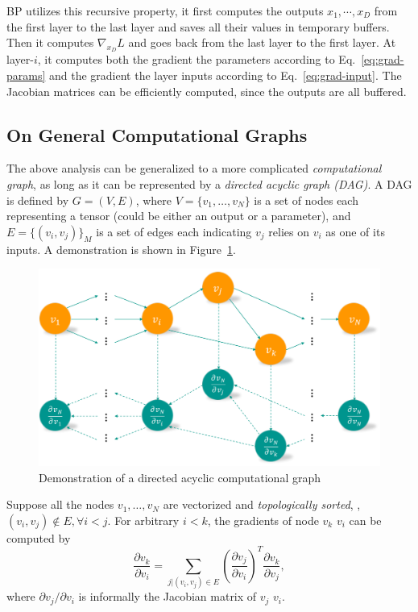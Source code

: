BP utilizes this recursive property, it first computes the outputs $x_1, \cdots, x_D$ from the first layer to the last layer and saves all their values in temporary buffers. Then it computes $\nabla_{x_D}L$ and goes back from the last layer to the first layer. At layer-$i$, it computes both the gradient \wrt the parameters according to Eq.~\eqref{eq:grad-params} and the gradient \wrt the layer inputs according to Eq.~\eqref{eq:grad-input}. The Jacobian matrices can be efficiently computed, since the outputs are all buffered.

\subsection{On General Computational Graphs} %
\label{sub:dl-bp-on-graphs}
The above analysis can be generalized to a more complicated \emph{computational graph}, as long as it can be represented by a \emph{directed acyclic graph (DAG)}. A DAG is defined by $G=(V,E)$, where $V=\{v_1,\dots,v_N\}$ is a set of nodes each representing a tensor (could be either an output or a parameter), and $E=\{(v_i, v_j)\}_M$ is a set of edges each indicating $v_j$ relies on $v_i$ as one of its inputs. A demonstration is shown in Figure~\ref{fig:dl-dag}.
\begin{figure}[t]
\begin{center}
\includegraphics[width=1.0\linewidth]{figures/computational-graph.pdf}
\caption{Demonstration of a directed acyclic computational graph}
\label{fig:dl-dag}
\end{center}
\end{figure}

Suppose all the nodes $v_1,\dots,v_N$ are vectorized and \emph{topologically sorted}, \ie, $(v_i, v_j)\notin E, \forall i < j$. For arbitrary $i < k$, the gradients of node $v_k$ \wrt $v_i$ can be computed by
\begin{equation} \label{eq:grad-dag}
  \frac{\partial v_k}{\partial v_i} = \sum_{j | (v_i, v_j) \in E} \left(\frac{\partial v_j}{\partial v_i}\right)^T \frac{\partial v_k}{\partial v_j},
\end{equation}
where $\partial v_j/\partial v_i$ is informally the Jacobian matrix of $v_j$ \wrt $v_i$.

